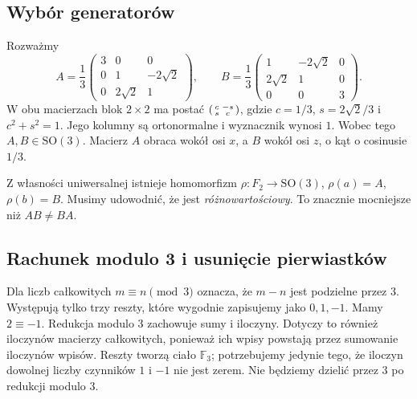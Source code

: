 \documentclass[11pt,a4paper]{article}
\numberwithin{equation}{section}
\theoremstyle{plain}
\theoremstyle{definition}
\theoremstyle{remark}
\newcommand{\F}{\mathbb F}
\begin{document}
\subsection{Wybór generatorów}
Rozważmy
\begin{equation}\label{eq:5-1}
 A=\frac13\begin{pmatrix}3&0&0\\0&1&-2\sqrt2\\0&2\sqrt2&1\end{pmatrix},\qquad
 B=\frac13\begin{pmatrix}1&-2\sqrt2&0\\2\sqrt2&1&0\\0&0&3\end{pmatrix}.
\end{equation}
W obu macierzach blok $2\times2$ ma postać $\begin{psmallmatrix}c&-s\\s&c\end{psmallmatrix}$, gdzie $c=1/3$, $s=2\sqrt2/3$ i $c^2+s^2=1$. Jego kolumny są ortonormalne i wyznacznik wynosi $1$. Wobec tego $A,B\in\mathrm{SO}(3)$. Macierz $A$ obraca wokół osi $x$, a $B$ wokół osi $z$, o kąt o cosinusie $1/3$.

Z własności uniwersalnej istnieje homomorfizm $\rho:F_2\to\mathrm{SO}(3)$, $\rho(a)=A$, $\rho(b)=B$. Musimy udowodnić, że jest \emph{różnowartościowy}. To znacznie mocniejsze niż $AB\ne BA$.

\subsection{Rachunek modulo 3 i usunięcie pierwiastków}
Dla liczb całkowitych $m\equiv n\pmod3$ oznacza, że $m-n$ jest podzielne przez $3$. Występują tylko trzy reszty, które wygodnie zapisujemy jako $0,1,-1$. Mamy $2\equiv-1$. Redukcja modulo $3$ zachowuje sumy i iloczyny. Dotyczy to również iloczynów macierzy całkowitych, ponieważ ich wpisy powstają przez sumowanie iloczynów wpisów. Reszty tworzą ciało $\F_3$; potrzebujemy jedynie tego, że iloczyn dowolnej liczby czynników $1$ i $-1$ nie jest zerem. Nie będziemy dzielić przez $3$ po redukcji modulo $3$.
\end{document}
